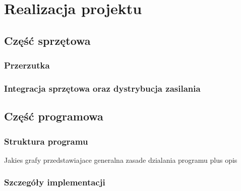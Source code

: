 \chapter{Realizacja projektu}
\section{Część sprzętowa}
\subsection{Przerzutka }
\subsection{Integracja sprzętowa oraz dystrybucja zasilania}

\section{Część programowa}
\subsection{Struktura programu}
Jakies grafy przedstawiajace generalna zasade dzialania programu plus opis

\subsection{Szczegóły implementacji}





